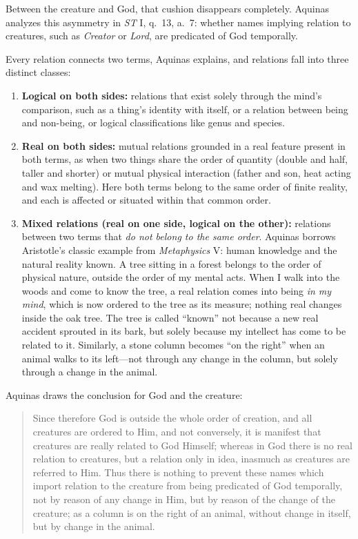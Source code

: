 Between the creature and God, that cushion disappears completely. Aquinas analyzes this asymmetry in \emph{ST} I, q.\ 13, a.\ 7: whether names implying relation to creatures, such as \emph{Creator} or \emph{Lord}, are predicated of God temporally.

Every relation connects two terms, Aquinas explains, and relations fall into three distinct classes:
\begin{enumerate}
\item \textbf{Logical on both sides:} relations that exist solely through the mind's comparison, such as a thing's identity with itself, or a relation between being and non-being, or logical classifications like genus and species.
\item \textbf{Real on both sides:} mutual relations grounded in a real feature present in both terms, as when two things share the order of quantity (double and half, taller and shorter) or mutual physical interaction (father and son, heat acting and wax melting). Here both terms belong to the same order of finite reality, and each is affected or situated within that common order.
\item \textbf{Mixed relations (real on one side, logical on the other):} relations between two terms that \emph{do not belong to the same order}. Aquinas borrows Aristotle's classic example from \emph{Metaphysics} V: human knowledge and the natural reality known. A tree sitting in a forest belongs to the order of physical nature, outside the order of my mental acts. When I walk into the woods and come to know the tree, a real relation comes into being \emph{in my mind}, which is now ordered to the tree as its measure; nothing real changes inside the oak tree. The tree is called ``known'' not because a new real accident sprouted in its bark, but solely because my intellect has come to be related to it. Similarly, a stone column becomes ``on the right'' when an animal walks to its left---not through any change in the column, but solely through a change in the animal.
\end{enumerate}

Aquinas draws the conclusion for God and the creature:

\begin{quote}
Since therefore God is outside the whole order of creation, and all creatures are ordered to Him, and not conversely, it is manifest that creatures are really related to God Himself; whereas in God there is no real relation to creatures, but a relation only in idea, inasmuch as creatures are referred to Him. Thus there is nothing to prevent these names which import relation to the creature from being predicated of God temporally, not by reason of any change in Him, but by reason of the change of the creature; as a column is on the right of an animal, without change in itself, but by change in the animal.
\end{quote}

